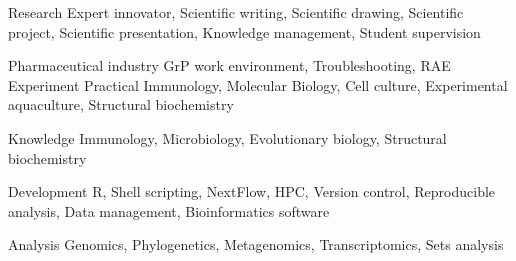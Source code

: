 

\begin{cvskills}

  \cvskill
    {Research} %
    {Expert innovator, Scientific writing, Scientific drawing, Scientific project, Scientific presentation, \hfill \break Knowledge management, Student supervision} %
    
  \cvskill
    {Pharmaceutical industry} %
    {GrP work environment, Troubleshooting, RAE} %
  \cvskill
    {Experiment} %
    {Practical Immunology, Molecular Biology, Cell culture, Experimental aquaculture, Structural biochemistry} %
    
  \cvskill
    {Knowledge} %
    {Immunology, Microbiology, Evolutionary biology, Structural biochemistry} %
    
  \cvskill
    {Development} %
    {R, Shell scripting, NextFlow, HPC, Version control, Reproducible analysis, Data management, Bioinformatics software} %
    
  \cvskill
    {Analysis} %
    {Genomics, Phylogenetics, Metagenomics, Transcriptomics, Sets analysis} %

\end{cvskills}